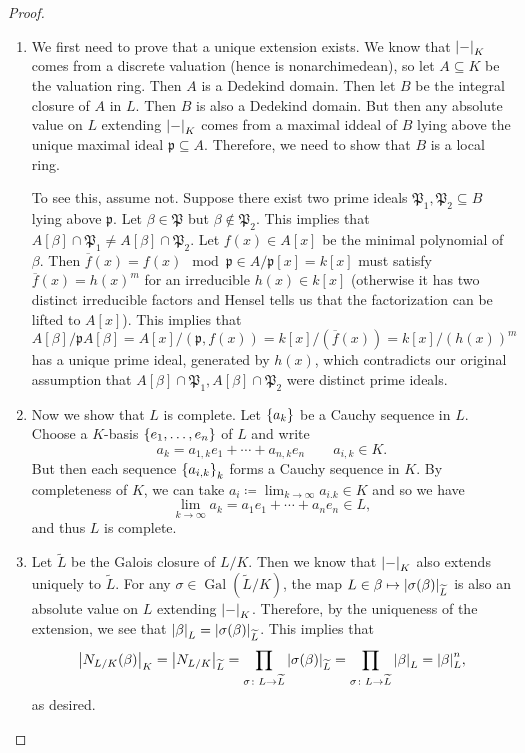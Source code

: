 \documentclass[leqno, openany]{memoir}
\theoremstyle{definition}
\theoremstyle{remark}
\theoremstyle{plain}
\theoremstyle{definition}
\theoremstyle{remark}
\newcommand{\mf}[1]{\mathfrak{#1}}
\newcommand{\ol}[1]{\overline{#1}}
\newcommand{\wt}[1]{\widetilde{#1}}
\DeclareMathOperator{\Gal}{Gal}
\begin{document}
\begin{proof}\leavevmode \begin{enumerate} \item We first need to prove that a
    unique extension exists. We know that $\abs{-}_K$ comes from a discrete
    valuation (hence is nonarchimedean), so let $A \subseteq K$ be the
    valuation ring. Then $A$ is a Dedekind domain. Then let $B$ be the integral
    closure of $A$ in $L$. Then $B$ is also a Dedekind domain. But then any
    absolute value on $L$ extending $\abs{-}_K$ comes from a maximal iddeal of
    $B$ lying above the unique maximal ideal $\mf{p} \subseteq A$. Therefore,
    we need to show that $B$ is a local ring.

            To see this, assume not. Suppose there exist two prime ideals
            $\mf{P}_1, \mf{P}_2 \subseteq B$ lying above $\mf{p}$. Let $\beta
            \in \mf{P}$ but $\beta \notin \mf{P}_2$. This implies that
            $A[\beta] \cap \mf{P}_1 \neq A[\beta] \cap \mf{P}_2$. Let $f(x) \in
            A[x]$ be the minimal polynomial of $\beta$. Then $\ol{f}(x) = f(x)
            \mod \mf{p} \in A/\mf{p}[x] = k[x]$ must satisfy $\ol{f}(x) =
            {h(x)}^m$ for an irreducible $h(x) \in k[x]$ (otherwise it has two
            distinct irreducible factors and Hensel tells us that the
            factorization can be lifted to $A[x]$). This implies that \[
            A[\beta] / \mf{p} A[\beta] = A[x]/(\mf{p}, f(x)) = k[x] /
        (\ol{f}(x)) = k[x]/(h(x))^m \] has a unique prime ideal, generated by
        $h(x)$, which contradicts our original assumption that $A[\beta] \cap
        \mf{P}_1, A[\beta] \cap \mf{P}_2$ were distinct prime ideals.  \item
        Now we show that $L$ is complete. Let $\qty{a_k}$ be a Cauchy sequence
        in $L$. Choose a $K$-basis $\qty{e_1, \ldots, e_n}$ of $L$ and write \[
        a_k = a_{1,k} e_1 + \cdots + a_{n,k} e_n \qquad a_{i,k} \in K. \] But
        then each sequence $\qty{a_{i,k}}_k$ forms a Cauchy sequence in $K$. By
        completeness of $K$, we can take $a_i \coloneqq \lim_{k \to \infty}
        a_{i.k} \in K$ and so we have \[ \lim_{k \to \infty} a_k = a_1 e_1 +
        \cdots + a_n e_n \in L, \] and thus $L$ is complete.  \item Let
        $\wt{L}$ be the Galois closure of $L/K$. Then we know that $\abs{-}_K$
        also extends uniquely to $\wt{L}$. For any $\sigma \in \Gal(\wt{L}/K)$,
        the map $L \in \beta \mapsto \abs{\sigma(\beta)}_{\wt{L}}$ is also an
        absolute value on $L$ extending $\abs{-}_K$. Therefore, by the
        uniqueness of the extension, we see that $\abs{\beta}_L =
        \abs{\sigma(\beta)}_{\wt{L}}$. This implies that \[
        \abs{N_{L/K}(\beta)}_K = \abs{N_{L/K}}_{\wt{L}} = \prod_{\sigma \colon
    L \to \wt{L}} \abs{\sigma(\beta)}_{\wt{L}} = \prod_{\sigma \colon L \to
    \wt{L}} \abs{\beta}_L = \abs{\beta}_L^n, \] as desired. \qedhere
    \end{enumerate} \end{proof}
\end{document}
